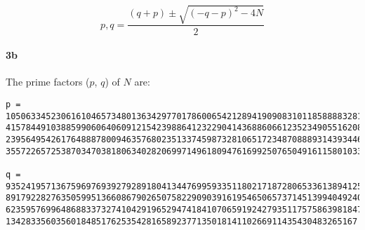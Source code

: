 \documentclass[12pt]{article}
\begin{document}
\[
    p,q = \frac{(q + p) \pm \sqrt{(-q-p)^2-4N}}{2}
\]


\paragraph{3b}

The prime factors ($p$, $q$) of $N$ are:

\begin{verbatim}
p = 
1050633452306161046573480136342977017860065421289419090831011858888328139819275
4157844910388599060640609121542398864123229041436886066123523490551620883141000
2395649542617648887800946357680235133745987328106517234870888931439344639465469
355722657253870347038180634028206997149618094761699250765049161158010333

q =
9352419571367596976939279289180413447699593351180217187280653361389412531812702
8917922827635059951366086790265075822909039161954650657371451399404924083352681
6235957699648688337327410429196529474184107065919242793511757586398184746028719
1342833560356018485176253542816589237713501814110266911435430483265167
\end{verbatim}
\end{document}
